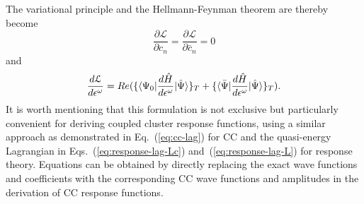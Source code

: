 The variational principle and the Hellmann-Feynman theorem are thereby become
\begin{equation}
\frac{\partial \mathcal{L}}{\partial c_{n}} = \frac{\partial \mathcal{L}}{\partial \bar{c}_{n}} = 0
\end{equation}
and
\begin{equation}
\frac{d\mathcal{	L}}{d\epsilon^{\omega}}=Re(\{\langle\Psi_{0} |\frac{d\hat{H}}{d\epsilon^{\omega}}| \hat{\Psi} \rangle\}_{T} + \{\langle\bar{\Psi} |\frac{d\hat{H}}{d\epsilon^{\omega}}| \hat{\Psi} \rangle\}_{T}).
\end{equation}
It is worth mentioning that this formulation is not exclusive but particularly convenient for deriving coupled cluster response functions, using a similar approach as demonstrated in Eq.~(\ref{eq:cc-lag}) for CC and the quasi-energy Lagrangian in Eqs.~(\ref{eq:response-lag-Lc}) and~(\ref{eq:response-lag-L}) for response theory. Equations can be obtained by directly replacing the exact wave functions and coefficients with the corresponding CC wave functions and amplitudes in the derivation of CC response functions.

